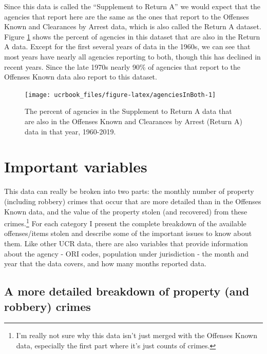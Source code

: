 \documentclass[
  12pt,
  openany]{book}
\begin{document}
Since this data is called the ``Supplement to Return A'' we would expect that the agencies that report here are the same as the ones that report to the Offenses Known and Clearances by Arrest data, which is also called the Return A dataset. Figure \ref{fig:agenciesInBoth} shows the percent of agencies in this dataset that are also in the Return A data. Except for the first several years of data in the 1960s, we can see that most years have nearly all agencies reporting to both, though this has declined in recent years. Since the late 1970s nearly 90\% of agencies that report to the Offenses Known data also report to this dataset.

\begin{figure}

{\centering \texttt{[image: ucrbook\_files/figure-latex/agenciesInBoth-1]} 

}

\caption{The percent of agencies in the Supplement to Return A data that are also in the Offenses Known and Clearances by Arrest (Return A) data in that year, 1960-2019.}\label{fig:agenciesInBoth}
\end{figure}

\hypertarget{important-variables-1}{%
\section{Important variables}\label{important-variables-1}}

This data can really be broken into two parts: the monthly number of property (including robbery) crimes that occur that are more detailed than in the Offenses Known data, and the value of the property stolen (and recovered) from these crimes.\footnote{I'm really not sure why this data isn't just merged with the Offenses Known data, especially the first part where it's just counts of crimes.} For each category I present the complete breakdown of the available offenses/items stolen and describe some of the important issues to know about them. Like other UCR data, there are also variables that provide information about the agency - ORI codes, population under jurisdiction - the month and year that the data covers, and how many months reported data.

\hypertarget{propertycount}{%
\subsection{A more detailed breakdown of property (and robbery) crimes}\label{propertycount}}
\end{document}
